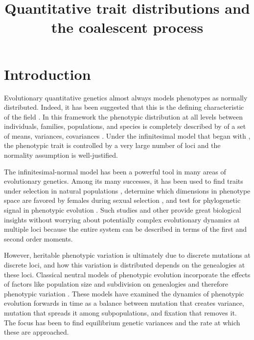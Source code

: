 \documentclass{article}
\begin{document}
\title{Quantitative trait distributions and the coalescent process}
\maketitle

\section{Introduction}

Evolutionary quantitative genetics almost always models phenotypes as normally
distributed. Indeed, it has been suggested that this is the defining
characteristic of the field \citep{Rice2004}. In this framework the phenotypic
distribution at all levels between individuals, families, populations, and
species is completely described by of a set of means, variances, covariances
\citep{Falconer1996}. Under the infinitesimal model that began with
\citet{Fisher1919}, the phenotypic trait is controlled by a very large number of
loci and the normality assumption is well-justified.

The infinitesimal-normal model has been a powerful tool in many areas of evolutionary
genetics. Among its many successes, it has been used to find traits under
selection in natural populations \citep{Price1984}, determine which dimensions
in phenotype space are favored by females during sexual selection
\citep{Blows2004}, and test for phylogenetic signal in phenotypic evolution
\citep{Freckleton2002}. Such studies and other provide great biological insights
without worrying about potentially complex evolutionary dynamics at multiple
loci because the entire system can be described in terms of the first and second
order moments.

However, heritable phenotypic variation is ultimately due to discrete mutations
at discrete loci, and how this variation is distributed depends on the
genealogies at these loci. Classical neutral models of phenotypic evolution
incorporate the effects of factors like population size and subdivision on
genealogies and therefore phenotypic variation \citep{Lynch1986,Lande1992}.
These models have examined the dynamics of phenotypic evolution forwards in time
as a balance between mutation that creates variance, mutation that spreads it
among subpopulations, and fixation that removes it. The focus has been to find
equilibrium genetic variances and the rate at which these are approached.
\end{document}
